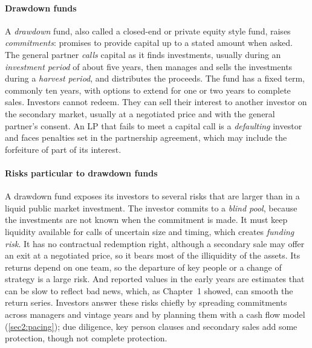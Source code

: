 \begin{chapterrefs}
\paragraph{Drawdown funds}
A \emph{drawdown} fund, also called a closed-end or private equity style fund, raises
\emph{commitments}: promises to provide capital up to a stated amount when asked. The general partner
\emph{calls} capital as it finds investments, usually during an \emph{investment period} of about five
years, then manages and sells the investments during a \emph{harvest period}, and distributes the
proceeds. The fund has a fixed term, commonly ten years, with options to extend for one or two years to
complete sales. Investors cannot redeem. They can sell their interest to another investor on the
secondary market, usually at a negotiated price and with the general partner's consent. An LP that
fails to meet a capital call is a \emph{defaulting} investor and faces penalties set in the partnership
agreement, which may include the forfeiture of part of its interest.

\paragraph{Risks particular to drawdown funds}
A drawdown fund exposes its investors to several risks that are larger than in a liquid public
market investment. The investor commits
to a \emph{blind pool}, because the investments are not known when the commitment is made. It must keep
liquidity available for calls of uncertain size and timing, which creates \emph{funding risk}. It has no
contractual redemption right, although a secondary sale may offer an exit at a negotiated price, so
it bears most of the illiquidity of the assets. Its returns depend on one team, so the departure
of key people or a change of strategy is a large risk. And reported values in the early years are
estimates that can be slow to reflect bad news, which, as Chapter~1 showed, can smooth the return series.
Investors answer these risks chiefly by spreading commitments across managers and vintage years and by
planning them with a cash flow model (\cref{sec2:pacing}); due diligence, key person clauses and
secondary sales add some protection, though not complete protection.


\end{chapterrefs}
